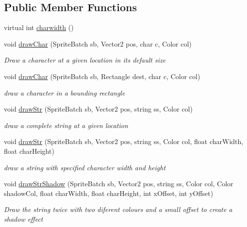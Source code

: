 \subsection*{Public Member Functions}
\begin{DoxyCompactItemize}
\item 
virtual int \mbox{\hyperlink{class_r_c___framework_1_1_font_parent_af32d5427b8feea59eb6f303ac3c36516}{charwidth}} ()
\item 
void \mbox{\hyperlink{class_r_c___framework_1_1_font_parent_a28b42b3aa17c44feb6f49065384ce9a7}{draw\+Char}} (Sprite\+Batch sb, Vector2 pos, char c, Color col)
\begin{DoxyCompactList}\small\item\em Draw a character at a given location in its default size \end{DoxyCompactList}\item 
void \mbox{\hyperlink{class_r_c___framework_1_1_font_parent_a8fb5fb02b85bc29031c0ccb8be1a7f61}{draw\+Char}} (Sprite\+Batch sb, Rectangle dest, char c, Color col)
\begin{DoxyCompactList}\small\item\em draw a character in a bounding rectangle \end{DoxyCompactList}\item 
void \mbox{\hyperlink{class_r_c___framework_1_1_font_parent_aa6d149fd5047fcc7b56dcbdcea21b5cc}{draw\+Str}} (Sprite\+Batch sb, Vector2 pos, string ss, Color col)
\begin{DoxyCompactList}\small\item\em draw a complete string at a given location \end{DoxyCompactList}\item 
void \mbox{\hyperlink{class_r_c___framework_1_1_font_parent_a4908cf6c8b915b517659eb1d1bef5a21}{draw\+Str}} (Sprite\+Batch sb, Vector2 pos, string ss, Color col, float char\+Width, float char\+Height)
\begin{DoxyCompactList}\small\item\em draw a string with specified character width and height \end{DoxyCompactList}\item 
void \mbox{\hyperlink{class_r_c___framework_1_1_font_parent_a54618265337f31d80bc6c82487855222}{draw\+Str\+Shadow}} (Sprite\+Batch sb, Vector2 pos, string ss, Color col, Color shadow\+Col, float char\+Width, float char\+Height, int x\+Offset, int y\+Offset)
\begin{DoxyCompactList}\small\item\em Draw the string twice with two diferent colours and a small offset to create a shadow effect \end{DoxyCompactList}\item 

\end{DoxyCompactItemize}
